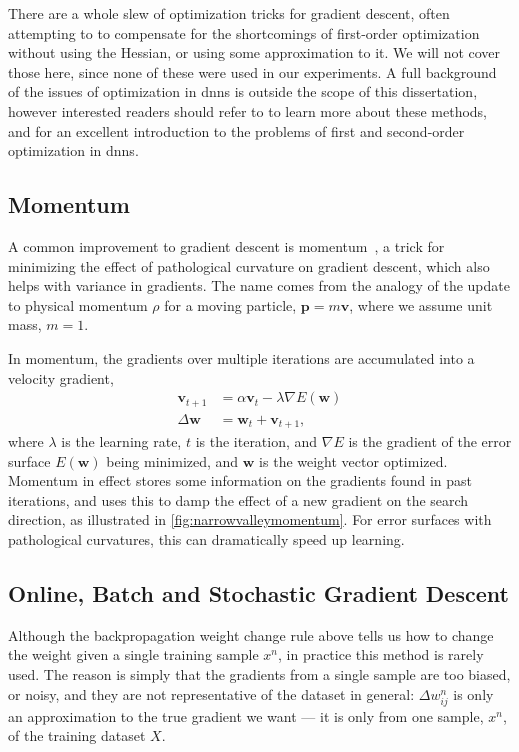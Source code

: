 \documentclass[thesis]{subfiles}
\begin{document}
There are a whole slew of optimization tricks for gradient descent, often attempting to to compensate for the shortcomings of first-order optimization without using the Hessian, or using some approximation to it. We will not cover those here, since none of these were used in our experiments. A full background of the issues of optimization in \glspl{dnn} is outside the scope of this dissertation, however interested readers should refer to \citet{goodfellow2016deep} to learn more about these methods, and \citet{martens2010deep} for an excellent introduction to the problems of first and second-order optimization in \glspl{dnn}.

\subsection{Momentum}
A common improvement to gradient descent is momentum~\citep{polyak1964some,rumelhartbackprop}, a trick for minimizing the effect of pathological curvature on gradient descent, which also helps with variance in gradients. The name comes from the analogy of the update to physical momentum $\rho$ for a moving particle, $\mathbf{p}=m\mathbf{v}$, where we assume unit mass, $m=1$.

In momentum, the gradients over multiple iterations are accumulated into a velocity gradient, 
\begin{equation}
\begin{aligned}
\mathbf{v}_{t+1} &= \alpha \mathbf{v}_t - \lambda\nabla E(\mathbf{w})\\
\Delta\mathbf{w} &= \mathbf{w}_t + \mathbf{v}_{t+1},
\end{aligned}
\end{equation}
where $\lambda$ is the learning rate, $t$ is the iteration, and $\nabla E$ is the gradient of the error surface $E(\mathbf{w})$ being minimized, and $\mathbf{w}$ is the weight vector optimized. Momentum in effect stores some information on the gradients found in past iterations, and uses this to damp the effect of a new gradient on the search direction, as illustrated in \cref{fig:narrowvalleymomentum}. For error surfaces with pathological curvatures, this can dramatically speed up learning.

\subsection{Online, Batch and Stochastic Gradient Descent}
Although the backpropagation weight change rule above tells us how to change the weight given a single training sample $x^n$, in practice this method is rarely used. The reason is simply that the gradients from a single sample are too biased, or noisy, and they are not representative of the dataset in general: $\Delta w^n_{ij}$ is only an approximation to the true gradient we want --- it is only from one sample, $x^n$, of the training dataset $X$. 
\end{document}
